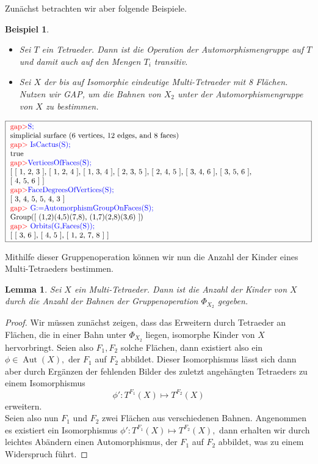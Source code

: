 \documentclass[12pt,titlepage,twoside,cleardoublepage]{article}
\theoremstyle{nummermitklammern}
\newtheorem{lemma}[temp]{Lemma}
\newtheorem{bsp}[temp]{Beispiel}
\newtheorem{lemma}[zahl]{Lemma}
\newtheorem{bsp}[zahl]{Beispiel}
\numberwithin{equation}{section}
\DeclareMathOperator{\Aut}{Aut}
\begin{document}
Zunächst betrachten wir aber folgende Beispiele. 
\begin{bsp}
\begin{itemize}
\item Sei $T$ ein Tetraeder. Dann ist die Operation der Automorphismengruppe auf $T$ und damit auch auf den Mengen $T_i$ transitiv.
\item Sei $X$ der bis auf Isomorphie eindeutige Multi-Tetraeder mit 8 Flächen. Nutzen wir GAP, um die Bahnen von $X_2$ unter der Automorphismengruppe von $X$ zu bestimmen.
\end{itemize}
\end{bsp}
\begin{center}
$\fbox{
\parbox{14cm} {
\textcolor{red}{gap$>$}\textcolor{blue}{ S;}\newline
simplicial surface (6 vertices, 12 edges, and 8 faces)\newline
\textcolor{red}{gap$>$} \textcolor{blue}{ IsCactus(S);}\newline
true\newline
\textcolor{red}{gap$>$}\textcolor{blue}{  VerticesOfFaces(S);}\newline
[ [ 1, 2, 3 ], [ 1, 2, 4 ], [ 1, 3, 4 ], [ 2, 3, 5 ], [ 2, 4, 5 ], [ 3, 4, 6 ], [ 3, 5, 6 ],\newline
  [ 4, 5, 6 ] ]\newline
\textcolor{red}{gap$>$}\textcolor{blue}{  FaceDegreesOfVertices(S);}\newline
[ 3, 4, 5, 5, 4, 3 ]\newline
\textcolor{red}{gap$>$} \textcolor{blue}{ G:=AutomorphismGroupOnFaces(S);}\newline
Group([ (1,2)(4,5)(7,8), (1,7)(2,8)(3,6) ])\newline
\textcolor{red}{gap$>$} \textcolor{blue}{ Orbits(G,Faces(S));}\newline
[ [ 3, 6 ], [ 4, 5 ], [ 1, 2, 7, 8 ] ]
}}$
\end{center}
Mithilfe dieser Gruppenoperation können wir nun die Anzahl der Kinder eines Multi-Tetraeders bestimmen.
\begin{lemma}\label{bahn}
Sei $X$ ein Multi-Tetraeder. Dann ist die Anzahl der Kinder von $X$ durch die Anzahl der Bahnen der Gruppenoperation $\Phi_{X_2}$ gegeben.
\end{lemma}
\begin{proof}
Wir müssen zunächst zeigen, dass das Erweitern durch Tetraeder an Flächen, die in einer Bahn unter $\Phi_{X_2}$ liegen, isomorphe Kinder von $X$ hervorbringt. Seien also $F_1,F_2$ solche Flächen, dann existiert also ein $\phi \in \Aut(X),$ der $F_1$ auf $F_2$ abbildet. Dieser Isomorphismus lässt sich dann aber durch Ergänzen der fehlenden Bilder des zuletzt angehängten Tetraeders zu einem Isomorphismus 
\[
\phi':T^{F_1}(X)\mapsto T^{F_2}(X)
\]
 erweitern. \\
 Seien also nun $F_1$ und $F_2$ zwei Flächen aus verschiedenen Bahnen. Angenommen es existiert ein Isomorphismus $\phi':T^{F_1}(X)\mapsto T^{F_2}(X),$ dann erhalten wir durch leichtes Abändern einen Automorphismus, der $F_1$ auf $F_2$ abbildet, was zu einem Widerspruch führt. 
\end{proof}
\end{document}

